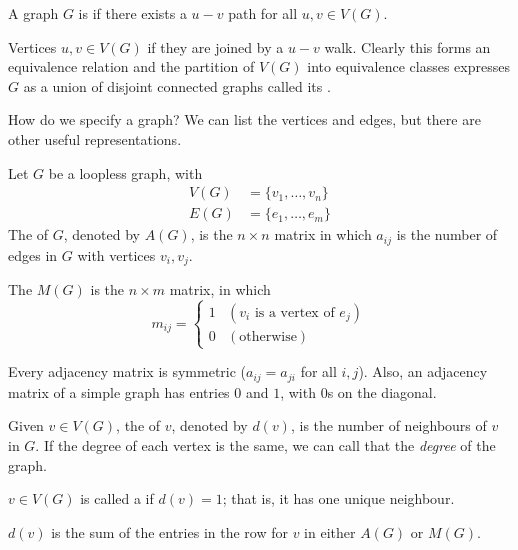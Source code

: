 \begin{definition}[Connectedness]
A graph $G$ is  if there exists a $u-v$ path for all $u,v\in V(G)$.

Vertices $u,v\in V(G)$  if they are joined by a $u-v$ walk. Clearly this forms an equivalence relation and the partition of $V(G)$ into equivalence classes expresses $G$ as a union of disjoint connected graphs called its .
\end{definition}

How do we specify a graph? We can list the vertices and edges, but there are other useful representations. 

\begin{definition}
Let $G$ be a loopless graph, with
\begin{align*}
V(G)&=\{v_1,\dots,v_n\}\\
E(G)&=\{e_1,\dots,e_m\}
\end{align*}
The  of $G$, denoted by $A(G)$, is the $n\times n$ matrix in which $a_{ij}$ is the number of edges in $G$ with vertices $v_i,v_j$. 

The  $M(G)$ is the $n\times m$ matrix, in which 
\[m_{ij}=\begin{cases}
1&(v_i\text{ is a vertex of }e_j)\\
0&(\text{otherwise})
\end{cases}\]
\end{definition}

\begin{remark}
Every adjacency matrix is symmetric ($a_{ij}=a_{ji}$ for all $i,j$). Also, an adjacency matrix of a simple graph has entries $0$ and $1$, with $0$s on the diagonal.
\end{remark}

\begin{definition}
Given $v\in V(G)$, the  of $v$, denoted by $d(v)$, is the number of neighbours of $v$ in $G$. If the degree of each vertex is the same, we can call that the \emph{degree} of the graph.

$v\in V(G)$ is called a  if $d(v)=1$; that is, it has one unique neighbour.
\end{definition}

\begin{remark}
$d(v)$ is the sum of the entries in the row for $v$ in either $A(G)$ or $M(G)$.
\end{remark}

